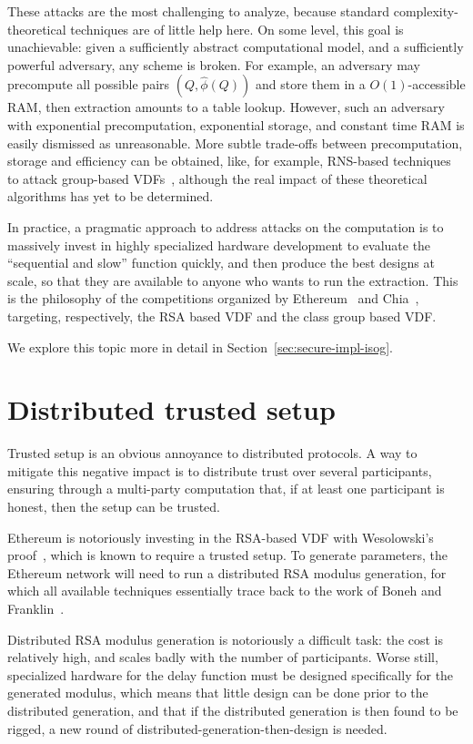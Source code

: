 \documentclass{llncs}
\begin{document}
These attacks are the most challenging to analyze, because standard
com\-plexity-theoretical techniques are of little help here. %
On some level, this goal is unachievable: given a sufficiently
abstract computational model, and a sufficiently powerful adversary,
any scheme is broken. %
For example, an adversary may precompute all possible pairs
$(Q,\hat\phi(Q))$ and store them in a $O(1)$-accessible RAM, then
extraction amounts to a table lookup. %
However, such an adversary with exponential precomputation,
exponential storage, and constant time RAM is easily dismissed as
unreasonable. %
More subtle trade-offs between precomputation, storage and efficiency
can be obtained, like, for example, RNS-based techniques to attack
group-based VDFs~\cite{BernsteinSorenson07}, although the real impact
of these theoretical algorithms has yet to be determined.

In practice, a pragmatic approach to address attacks on the
computation is to massively invest in highly specialized hardware
development to evaluate the ``sequential and slow'' function quickly,
and then produce the best designs at scale, so that they are available
to anyone who wants to run the extraction. %
This is the philosophy of the competitions organized by
Ethereum~\cite{ethereum-vdf} and Chia~\cite{chia-vdf}, targeting,
respectively, the RSA based VDF and the class group based VDF.

We explore this topic more in detail in
Section~\ref{sec:secure-impl-isog}.


\section{Distributed trusted setup}
\label{sec:distr-trust-setup}

Trusted setup is an obvious annoyance to distributed protocols. %
A way to mitigate this negative impact is to distribute trust over
several participants, ensuring through a multi-party computation that,
if at least one participant is honest, then the setup can be trusted.

Ethereum is notoriously investing in the RSA-based VDF with
Wesolowski's proof~\cite{ethereum-vdf,Wesolowski}, which is known to
require a trusted setup. %
To generate parameters, the Ethereum network will need to run a
distributed RSA modulus generation, for which all available techniques
essentially trace back to the work of Boneh and
Franklin~\cite{10.1007/BFb0052253}.

Distributed RSA modulus generation is notoriously a difficult task:
the cost is relatively high, and scales badly with the number of
participants. %
Worse still, specialized hardware for the delay function must be
designed specifically for the generated modulus, which means that
little design can be done prior to the distributed generation, and
that if the distributed generation is then found to be rigged, a new
round of distributed-generation-then-design is needed.
\end{document}
